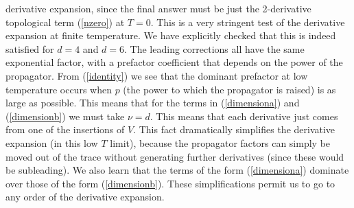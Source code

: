 \documentclass[a4paper,prd]{revtex4}
\begin{document}
derivative expansion, since the final answer must be just the
2-derivative topological term (\ref{nzero}) at $ T=0$. This is a very
stringent test of the derivative expansion at finite temperature. We have
explicitly checked that this is indeed satisfied for $d=4$ and $d=6$. The
leading corrections all have the same exponential factor, with a prefactor
coefficient that depends on the power of the propagator. From
(\ref{identity}) we see that the dominant prefactor at low temperature
occurs when $p$ (the power to which the propagator is raised) is as large
as possible. This means that for the terms in (\ref{dimensiona}) and
(\ref{dimensionb}) we must take $\nu =d$. This means that each derivative
just comes from one of the insertions of $V$. This fact dramatically simplifies the derivative
expansion (in this low $T$ limit), because the propagator factors can
simply be moved out of the trace without generating further derivatives
(since these would be subleading). We also learn that the terms
of the form (\ref{dimensiona}) dominate over those of the form
(\ref{dimensionb}). These simplifications permit us to go to any order of
the derivative expansion.
\end{document}
